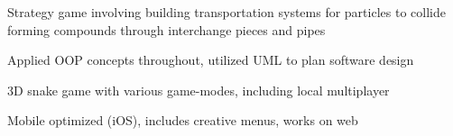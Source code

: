 \documentclass[]{deedy-resume-openfont}
\begin{document}
\begin{minipage}[t]{0.66\textwidth}
\begin{tightemize}
\item Strategy game involving building transportation systems for particles to collide forming compounds through interchange pieces and pipes\\
\item Applied OOP concepts throughout, utilized UML to plan software design \\
\end{tightemize}
\sectionsep


\begin{tightemize}
\item 3D snake game with various game-modes, including local multiplayer\\
\item Mobile optimized (iOS), includes creative menus, works on web\\
\end{tightemize}
\sectionsep





\end{minipage}
\end{document}
